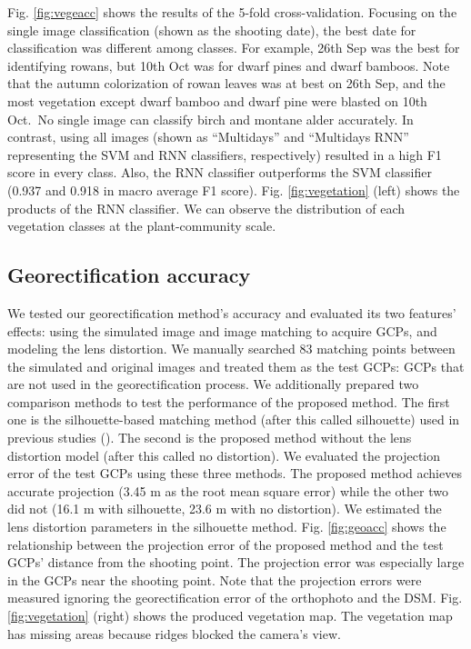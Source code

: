 \documentclass{article}
\begin{document}
Fig. \ref{fig:vegeacc} shows the results of the 5-fold cross-validation. Focusing on the single image classification (shown as the shooting date), the best date for classification was different among classes. For example, 26th Sep was the best for identifying rowans, but 10th Oct was for dwarf pines and dwarf bamboos. Note that the autumn colorization of rowan leaves was at best on 26th Sep, and the most vegetation except dwarf bamboo and dwarf pine were blasted on 10th Oct.~No single image can classify birch and montane alder accurately. In contrast, using all images (shown as ``Multidays'' and ``Multidays RNN'' representing the SVM and RNN classifiers, respectively) resulted in a high F1 score in every class. Also, the RNN classifier outperforms the SVM classifier (0.937 and 0.918 in macro average F1 score). Fig. \ref{fig:vegetation} (left) shows the products of the RNN classifier. We can observe the distribution of each vegetation classes at the plant-community scale.

\hypertarget{georectification-accuracy}{%
\subsection{Georectification accuracy}\label{georectification-accuracy}}

We tested our georectification method's accuracy and evaluated its two features' effects: using the simulated image and image matching to acquire GCPs, and modeling the lens distortion. We manually searched 83 matching points between the simulated and original images and treated them as the test GCPs: GCPs that are not used in the georectification process. We additionally prepared two comparison methods to test the performance of the proposed method. The first one is the silhouette-based matching method (after this called silhouette) used in previous studies (\cite{Portenier2020Cryosphere}). The second is the proposed method without the lens distortion model (after this called no distortion). We evaluated the projection error of the test GCPs using these three methods. The proposed method achieves accurate projection (3.45 m as the root mean square error) while the other two did not (16.1 m with silhouette, 23.6 m with no distortion). We estimated the lens distortion parameters in the silhouette method. Fig. \ref{fig:geoacc} shows the relationship between the projection error of the proposed method and the test GCPs' distance from the shooting point. The projection error was especially large in the GCPs near the shooting point. Note that the projection errors were measured ignoring the georectification error of the orthophoto and the DSM. Fig. \ref{fig:vegetation} (right) shows the produced vegetation map. The vegetation map has missing areas because ridges blocked the camera's view.
\end{document}
